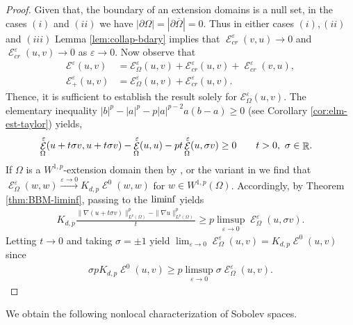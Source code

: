\documentclass[12pt, reqno]{amsart}%
\theoremstyle{plain}  %
\theoremstyle{definition}  %
\numberwithin{equation}{section}
\DeclareMathOperator{\cE}{\mathcal{E}}
\DeclareMathOperator{\R}{\mathbb{R}}
\newcommand{\eps}{\varepsilon}
\begin{document}
\begin{proof}
\noindent
Given that, the boundary of an extension domains is a null set, in the cases $(i)$ and $(ii)$ we have $|\partial\Omega|=|\partial\overline{\Omega}|=0$.   Thus in either cases $(i), (ii)$ and $(iii)$ Lemma \ref{lem:collap-bdary} implies that $\cE^{\eps}_{cr}(v,u)\to 0$ and $\cE^{\eps}_{cr}(u,v) \to0$ as $\eps\to0$. Now observe that
\begin{align*}
\mathcal{E}^{\eps}(u,v)&= \mathcal{E}^{\eps}_\Omega(u,v)+\mathcal{E}^{\eps}_{cr}(u,v)+\cE^{\eps}_{cr}(v,u),\\
\mathcal{E}^{\eps}_+(u,v)&= \mathcal{E}^{\eps}_\Omega(u,v)+\mathcal{E}^{\eps}_{cr}(u,v).
\end{align*}
Thence, it is sufficient to establish the result solely for
$\mathcal{E}^{\eps}_\Omega(u,v)$. The elementary inequality $|b|^p- |a|^p- p|a|^{p-2}a(b-a)\geq 0$ (see Corollary \ref{cor:elm-est-taylor}) yields,
\begin{align*}
&\cE_{\Omega}^\eps(u+t\sigma v, u+t\sigma v)- \cE_{\Omega}^\eps(u, u)- p t\cE_{\Omega}^\eps(u,\sigma v)
\geq0\qquad\text{$t>0$,\, $\sigma\in\R$}.
\end{align*}
If  $\Omega$ is a $W^{1,p}$-extension domain then by  \cite[Theorem 5.23]{guy-thesis}, \cite[Theorem 1.2]{Fog23} or  the variant in \cite{BBM01} we find that $\cE^\eps_\Omega(w, w) \xrightarrow{\eps\to0} K_{d,p}\cE^0(w, w)$ for $w\in W^{1,p}(\Omega)$. Accordingly, by Theorem \ref{thm:BBM-liminf}, passing to the $\lim\hspace{-0.5ex}\inf$  yields
\begin{align*}
K_{d,p}\frac{\|\nabla(u+t\sigma v)\|^p_{L^p(\Omega)}-\|\nabla u\|^p_{L^p(\Omega)}}{t}\geq p  \limsup_{\eps\to0} \cE_{\Omega}^\eps(u,\sigma v).
\end{align*}
Letting $t\to 0$ and taking $\sigma=\pm 1$ yield $\lim_{\eps\to0} \cE_{\Omega}^\eps(u, v)= K_{d,p}\cE^0(u, v)$ since
\begin{align*}
\sigma pK_{d,p}\cE^0(u, v)\geq p\limsup_{\eps\to0} \sigma\cE_{\Omega}^\eps(u, v).
\end{align*}
\end{proof}

\noindent We obtain the following nonlocal characterization of Sobolev spaces.
\end{document}
